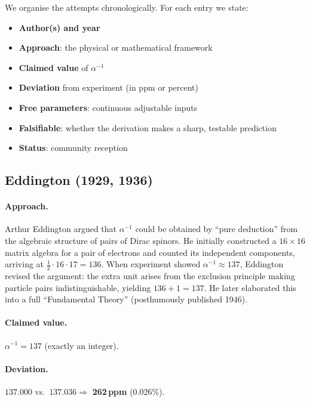 \documentclass[11pt,a4paper]{article}
\begin{document}
We organise the attempts chronologically.  For each entry we state:
\begin{itemize}[nosep]
\item \textbf{Author(s) and year}
\item \textbf{Approach}: the physical or mathematical framework
\item \textbf{Claimed value} of $\alpha^{-1}$
\item \textbf{Deviation} from experiment (in ppm or percent)
\item \textbf{Free parameters}: continuous adjustable inputs
\item \textbf{Falsifiable}: whether the derivation makes a sharp, testable prediction
\item \textbf{Status}: community reception
\end{itemize}

\subsection{Eddington (1929, 1936)}\label{sec:eddington}

\paragraph{Approach.}
Arthur Eddington argued that $\alpha^{-1}$ could be obtained by ``pure deduction'' from the algebraic structure of pairs of Dirac spinors.  He initially constructed a $16\times 16$ matrix algebra for a pair of electrons and counted its independent components, arriving at $\tfrac{1}{2}\cdot 16\cdot 17 = 136$.  When experiment showed $\alpha^{-1}\approx 137$, Eddington revised the argument: the extra unit arises from the exclusion principle making particle pairs indistinguishable, yielding $136 + 1 = 137$.  He later elaborated this into a full ``Fundamental Theory'' (posthumously published 1946).

\paragraph{Claimed value.}
$\alpha^{-1} = 137$ (exactly an integer).

\paragraph{Deviation.}
$137.000$ vs.\ $137.036 \Rightarrow$ \textbf{262\,ppm} (0.026\%).
\end{document}
